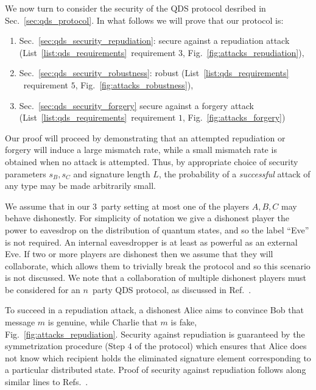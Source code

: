 We now turn to consider the security of the QDS protocol desribed in Sec.~\ref{sec:qds_protocol}. %
In what follows we will prove that our protocol is:
\begin{enumerate}
\item Sec.~\ref{sec:qds_security_repudiation}: secure against a repudiation attack (List~\ref{list:qds_requirements}~requirement $3$, Fig.~\ref{fig:attacks_repudiation}), 
\item Sec.~\ref{sec:qds_security_robustness}: robust (List~\ref{list:qds_requirements} ~requirement $5$, Fig.~\ref{fig:attacks_robustness}),
\item Sec.~\ref{sec:qds_security_forgery} secure against a forgery attack (List~\ref{list:qds_requirements}~requirement $1$, Fig.~\ref{fig:attacks_forgery})
\end{enumerate}

Our proof will proceed by demonstrating that an attempted repudiation or forgery will induce a large mismatch rate, while a small mismatch rate is obtained when no attack is attempted. Thus, by appropriate choice of security parameters $s_B, s_C$ and signature length $L$, the probability of a \emph{successful} attack of any type may be made arbitrarily small. 

We assume that in our $3$~party setting at most one of the players $A, B, C$ may behave dishonestly. For simplicity of notation we give a dishonest player the power to eavesdrop on the distribution of quantum states, and so the label ``Eve'' is not required. An internal eavesdropper is at least as powerful as an external Eve. If two or more players are dishonest then we assume that they will collaborate, which allows them to trivially break the protocol and so this scenario is not discussed. We note that a collaboration of multiple dishonest players must be considered for an $n$~party QDS protocol, as discussed in Ref.~\cite{Arrazola2016}.

To succeed in a repudiation attack, a dishonest Alice aims to convince Bob that message $m$ is genuine, while Charlie that $m$ is fake, Fig.~\ref{fig:attacks_repudiation}. Security against repudiation is guaranteed by the symmetrization procedure (Step $4$ of the protocol) which ensures that Alice does not know which recipient holds the eliminated signature element corresponding to a particular distributed state. Proof of security against repudiation follows along similar lines to Refs.~\cite{Dunjko2014, Wallden2015, Donaldson2016, Croal2016, Thornton2019}.

